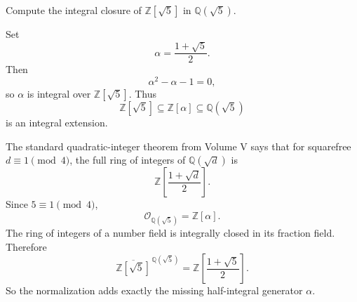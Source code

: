 \begin{problem}\label{prob:vi28-13}
Compute the integral closure of \(\mathbb Z[\sqrt5]\) in \(\mathbb Q(\sqrt5)\).

\end{problem}

\ifdefined\FullProblemDossiers
\begin{solution}
Set
\[
\alpha=\frac{1+\sqrt5}{2}.
\]
Then
\[
\alpha^2-\alpha-1=0,
\]
so \(\alpha\) is integral over \(\mathbb Z[\sqrt5]\). Thus
\[
\mathbb Z[\sqrt5]\subseteq\mathbb Z[\alpha]\subseteq\mathbb Q(\sqrt5)
\]
is an integral extension.

The standard quadratic-integer theorem from Volume V says that for squarefree \(d\equiv1\pmod4\), the full ring of integers of \(\mathbb Q(\sqrt d)\) is
\[
\mathbb Z\!\left[\frac{1+\sqrt d}{2}\right].
\]
Since \(5\equiv1\pmod4\),
\[
\mathcal O_{\mathbb Q(\sqrt5)}
=
\mathbb Z[\alpha].
\]
The ring of integers of a number field is integrally closed in its fraction field. Therefore
\[
\boxed{
\overline{\mathbb Z[\sqrt5]}^{\,\mathbb Q(\sqrt5)}
=
\mathbb Z\!\left[\frac{1+\sqrt5}{2}\right].
}
\]
So the normalization adds exactly the missing half-integral generator \(\alpha\).
\end{solution}
\fi
